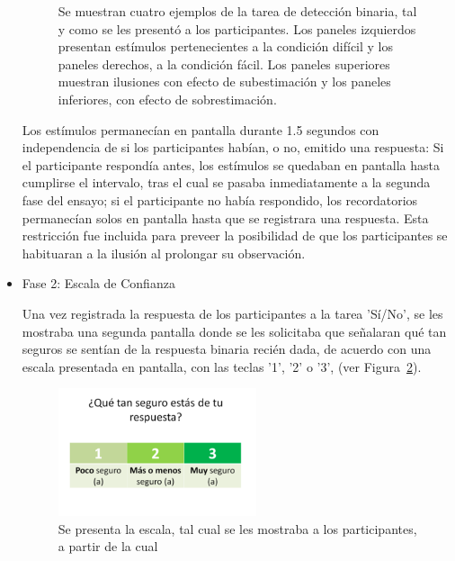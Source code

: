 \begin{itemize}
\begin{figure}[th]
\caption[Presentación de ensayos con tarea de detección binaria]{Se muestran cuatro ejemplos de la tarea de detección binaria, tal y como se les presentó a los participantes. Los paneles izquierdos presentan estímulos pertenecientes a la condición difícil y los paneles derechos, a la condición fácil. Los paneles superiores muestran ilusiones con efecto de subestimación y los paneles inferiores, con efecto de sobrestimación.}
\label{fig:Ejem_YN}
\end{figure}

Los estímulos permanecían en pantalla durante 1.5 segundos con independencia de si los participantes habían, o no, emitido una respuesta: Si el participante respondía antes, los estímulos se quedaban en pantalla hasta cumplirse el intervalo, tras el cual se pasaba inmediatamente a la segunda fase del ensayo; si el participante no había respondido, los recordatorios permanecían solos en pantalla hasta que se registrara una respuesta. Esta restricción fue incluida para preveer la posibilidad de que los participantes se habituaran a la ilusión al prolongar su observación.\\

\item Fase 2: Escala de Confianza

Una vez registrada la respuesta de los participantes a la tarea 'Sí/No', se les mostraba una segunda pantalla donde se les solicitaba que señalaran qué tan seguros se sentían de la respuesta binaria recién dada, de acuerdo con una escala presentada en pantalla, con las teclas '1', '2' o '3', (ver Figura~\ref{fig:Ejem_Esc}). \\

\begin{figure}[th]
\centering
\includegraphics[width=0.55\textwidth]{Figures/Ejemplo_Escala}
\caption[Presentación de la escala de confianza]{Se presenta la escala, tal cual se les mostraba a los participantes, a partir de la cual }
\label{fig:Ejem_Esc}
\end{figure}


\end{itemize}
